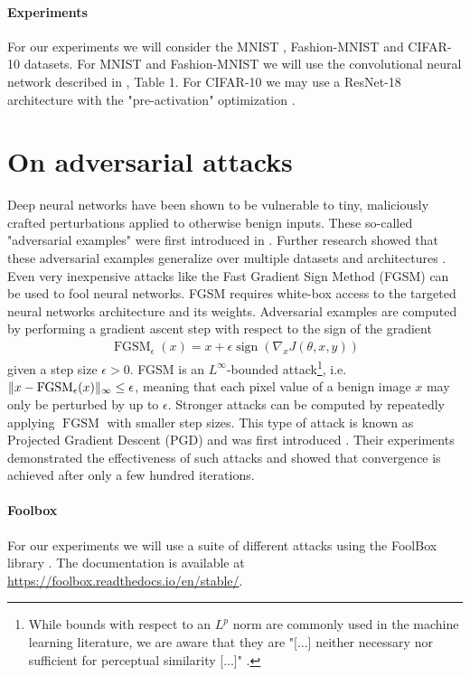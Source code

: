 \documentclass{article}
\begin{document}
\paragraph{Experiments}
For our experiments we will consider the MNIST \cite{deng2012mnist}, Fashion-MNIST \cite{xiao2017fashion} and CIFAR-10 \cite{krizhevsky2009learning} datasets. For MNIST and Fashion-MNIST we will use the convolutional neural network described in \cite{carlini2017towards}, Table 1. For CIFAR-10 we may use a ResNet-18 architecture \cite{he2016deep} with the "pre-activation" optimization \cite{he2016identity}. 

	
\section{On adversarial attacks}
Deep neural networks have been shown to be vulnerable to tiny, maliciously crafted perturbations applied to otherwise benign inputs. These so-called "adversarial examples" were first introduced in \cite{Szegedy13}. Further research showed that these adversarial examples generalize over multiple datasets and architectures \cite{goodfellow2014explaining}. Even very inexpensive attacks like the Fast Gradient Sign Method (FGSM) \cite{goodfellow2014explaining} can be used to fool neural networks. FGSM requires white-box access to the targeted neural networks architecture and its weights. Adversarial examples are computed by performing a gradient ascent step with respect to the sign of the gradient
\begin{align*}
	\operatorname{FGSM}_\epsilon(x) = x + \epsilon\operatorname{sign}(\nabla_x J(\theta,x,y)) 
\end{align*}
given a step size $\epsilon>0$. FGSM is an $L^\infty$-bounded attack\footnote{While bounds with respect to an $L^p$ norm are commonly used in the machine learning literature, we are aware that they are "[...] neither necessary nor sufficient for perceptual similarity [...]" \cite{sharif2018suitability}.}, i.e. $\lVert x-\operatorname{FGSM}_\epsilon(x)\rVert_\infty\le\epsilon$, meaning that each pixel value of a benign image $x$ may only be perturbed by up to $\epsilon$.
Stronger attacks can be computed by repeatedly applying $\operatorname{FGSM}$ with smaller step sizes. This type of attack is known as Projected Gradient Descent (PGD) and was first introduced \cite{madry2017towards}. Their experiments demonstrated the effectiveness of such attacks and showed that convergence is achieved after only a few hundred iterations. 

\paragraph{Foolbox}
For our experiments we will use a suite of different attacks using the FoolBox library \cite{rauber2017foolbox}. The documentation is available at \url{https://foolbox.readthedocs.io/en/stable/}. 



\end{document}

